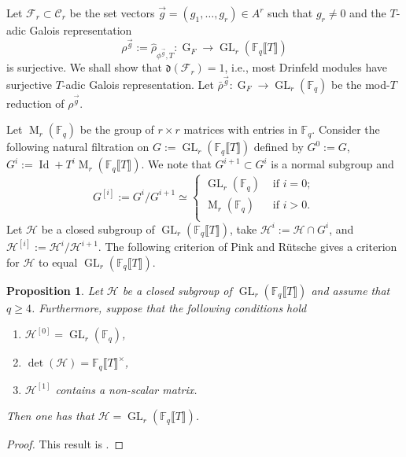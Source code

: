 \documentclass[11pt]{amsart}
\newtheorem{proposition}[theorem]{Proposition}
\newcommand{\cF}{\mathcal{F}}
\newcommand{\cH}{\mathcal{H}}
\newcommand{\F}{\mathbb{F}}
\newcommand{\cC}{\mathcal{C}}
\newcommand{\op}[1]{\operatorname{#1}}
\numberwithin{equation}{section}
\begin{document}
\par Let $\cF_r\subset \cC_r$ be the set vectors $\vec{g}=(g_1, \dots, g_r)\in A^r$ such that $g_r\neq 0$ and the $T$-adic Galois representation 
\[\rho^{\vec{g}}:=\hat{\rho}_{\phi^{\vec{g}}, T}: \op{G}_F\rightarrow \op{GL}_r\left(\F_q\llbracket T\rrbracket \right) \] is surjective. We shall show that $\mathfrak{d}(\cF_r)=1$, i.e., most Drinfeld modules have surjective $T$-adic Galois representation. Let $\bar{\rho}^{\vec{g}}:\op{G}_F\rightarrow \op{GL}_r(\F_q)$ be the mod-$T$ reduction of $\rho^{\vec{g}}$.
\par Let $\op{M}_r(\F_q)$ be the group of $r\times r$ matrices with entries in $\F_q$. Consider the following natural filtration on $G:=\op{GL}_r\left(\F_q\llbracket T\rrbracket \right)$ defined by $G^0:=G$, $G^i:=\op{Id}+T^i \op{M}_r(\F_q\llbracket T\rrbracket)$. We note that $G^{i+1}\subset G^i$ is a normal subgroup and 
\[G^{[i]}:=G^i/G^{i+1}\simeq \begin{cases}
    \op{GL}_r(\F_q) & \text{ if } i=0;\\
    \op{M}_r(\F_q) & \text{ if } i>0.\\
\end{cases}\]
Let $\mathcal{H}$ be a closed subgroup of $\op{GL}_r(\F_q\llbracket T\rrbracket)$, take $\mathcal{H}^i:=\mathcal{H}\cap G^i$, and $\mathcal{H}^{[i]}:=\mathcal{H}^i/\mathcal{H}^{i+1}$. The following criterion of Pink and R\"utsche gives a criterion for $\cH$ to equal $\op{GL}_r(\F_q\llbracket T \rrbracket)$.
\begin{proposition}\label{PR prop}
    Let $\mathcal{H}$ be a closed subgroup of $\op{GL}_r\left(\F_q\llbracket T \rrbracket\right)$ and assume that $q\geq 4$. Furthermore, suppose that the following conditions hold
    \begin{enumerate}
        \item $\mathcal{H}^{[0]}=\op{GL}_r\left(\F_q\right)$, 
          \item $\op{det}(\mathcal{H})=\F_q\llbracket T \rrbracket^\times$,
           \item $\mathcal{H}^{[1]}$ contains a non-scalar matrix.
    \end{enumerate}
    Then one has that $\mathcal{H}=\op{GL}_r(\F_q\llbracket T \rrbracket)$.
\end{proposition}
\begin{proof}
    This result is \cite[Proposition 4.1]{pinkrutsche}.
\end{proof}
\end{document}
